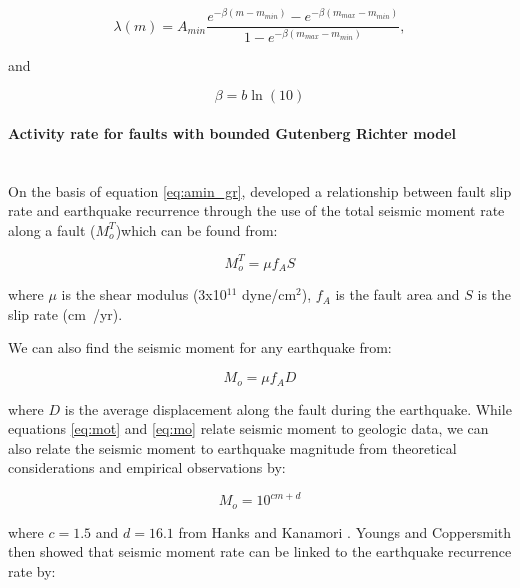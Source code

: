 \begin{enumerate}
\begin{equation} \label{eq:amin_gr}
\lambda(m) =
A_{min}\frac{e^{-\beta(m-m_{min})}-e^{-\beta(m_{max}-m_{min})}}{1-e^{-\beta(m_{max}-m_{min})}},
\end{equation}

\citet{dr_kramer96a} and 

\begin{equation}
\beta = b\ln(10)
\end{equation}



\paragraph{Activity rate for faults with bounded Gutenberg Richter model}
\label{sec:rv_flt_GR}
\\
On the basis of equation \ref{eq:amin_gr},  \citet{dr_youngs85} developed a relationship between fault slip 
rate and earthquake recurrence through the use of the total seismic moment rate along a fault ($M_o^T$)which can be found from:

\begin{equation} \label{eq:mot}
M_o^T = \mu f_A S
\end{equation}

where $\mu$ is the shear modulus (3x10$^{11}$ dyne/cm$^2$), $f_A$ is the fault area and $S$ is the slip rate (cm~/yr). 

We can also find the seismic moment for any earthquake from:

\begin{equation} \label{eq:mo}
M_o = \mu f_A D
\end{equation}

where $D$ is the average displacement along the fault during the earthquake. While equations \ref{eq:mot} and \ref{eq:mo} relate 
seismic moment to geologic data, we can also relate the seismic moment to earthquake magnitude from theoretical considerations and 
empirical observations by:

\begin{equation} \label{eq:mo_mag}
M_o = 10^{cm+d}
\end{equation}

where $c=1.5$ and $d=16.1$ from Hanks and Kanamori \cite{hanks1979}. Youngs and Coppersmith \cite{youngs1985} then showed that seismic 
moment rate can be linked to the earthquake recurrence rate by:


\end{enumerate}

